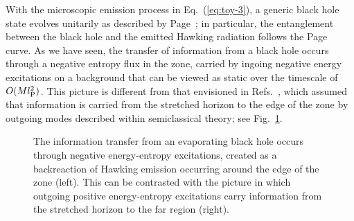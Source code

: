 \documentclass[12pt]{article}
\begin{document}
With the microscopic emission process in Eq.~(\ref{eq:toy-3}), 
a generic black hole state evolves unitarily as described by 
Page~\cite{Page:1993wv}; in particular, the entanglement between 
the black hole and the emitted Hawking radiation follows the Page 
curve.  As we have seen, the transfer of information from a black 
hole occurs through a negative entropy flux in the zone, carried 
by ingoing negative energy excitations on a background that can 
be viewed as static over the timescale of $O(M l_{\rm P}^2)$. 
This picture is different from that envisioned in 
Refs.~\cite{Almheiri:2012rt,Marolf:2013dba,Almheiri:2013hfa}, 
which assumed that information is carried from the stretched 
horizon to the edge of the zone by outgoing modes described 
within semiclassical theory; see Fig.~\ref{fig:info-trans}.
%
\begin{figure}[t]
\centering
\caption{The information transfer from an evaporating black hole 
 occurs through negative energy-entropy excitations, created as 
 a backreaction of Hawking emission occurring around the edge of 
 the zone (left). This can be contrasted with the picture in which 
 outgoing positive energy-entropy excitations carry information 
 from the stretched horizon to the far region (right).}
\label{fig:info-trans}
\end{figure}
%
\end{document}

